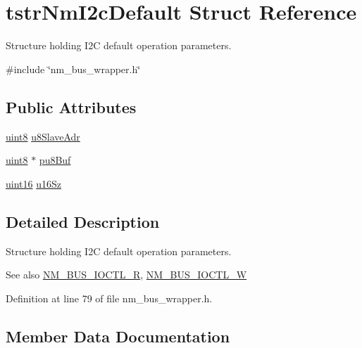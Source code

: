 \hypertarget{structtstrNmI2cDefault}{}\section{tstr\+Nm\+I2c\+Default Struct Reference}
\label{structtstrNmI2cDefault}


Structure holding I2C default operation parameters.  




{\ttfamily \#include \char`\"{}nm\+\_\+bus\+\_\+wrapper.\+h\char`\"{}}

\subsection*{Public Attributes}
\begin{DoxyCompactItemize}
\item 
\hyperlink{group__DataT_ga4df709a77647e870bbf1d955b8edc9a6}{uint8} \hyperlink{structtstrNmI2cDefault_ad4442fda783a3990095121cf06e67d11}{u8\+Slave\+Adr}
\item 
\hyperlink{group__DataT_ga4df709a77647e870bbf1d955b8edc9a6}{uint8} $\ast$ \hyperlink{structtstrNmI2cDefault_a2ac23818c4fc4d79aea42322c97d4a6f}{pu8\+Buf}
\item 
\hyperlink{group__DataT_ga1daa745171fc6e31d942c161422a76f9}{uint16} \hyperlink{structtstrNmI2cDefault_a1abd4cef868f57aae350bbe6b8210353}{u16\+Sz}
\end{DoxyCompactItemize}


\subsection{Detailed Description}
Structure holding I2C default operation parameters. 

\begin{DoxySeeAlso}{See also}
\hyperlink{nm__bus__wrapper_8h_addd8de7ba83342e5e5b7f3257c96ca73}{N\+M\+\_\+\+B\+U\+S\+\_\+\+I\+O\+C\+T\+L\+\_\+R}, \hyperlink{nm__bus__wrapper_8h_ad75667626720c298a87a21b184f5a82a}{N\+M\+\_\+\+B\+U\+S\+\_\+\+I\+O\+C\+T\+L\+\_\+W} 
\end{DoxySeeAlso}


Definition at line 79 of file nm\+\_\+bus\+\_\+wrapper.\+h.



\subsection{Member Data Documentation}
\mbox{\label{structtstrNmI2cDefault_a2ac23818c4fc4d79aea42322c97d4a6f}} 
